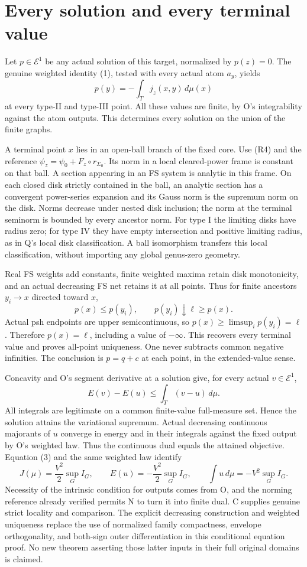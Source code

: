 \documentclass[
  11pt,
]{article}
\begin{document}
\section{Every solution and every terminal
value}\label{every-solution-and-every-terminal-value}

Let \(p\in\mathcal E^1\) be any actual solution of this target,
normalized by \(p(z)=0\). The genuine weighted identity (1), tested with
every actual atom \(a_y\), yields \[
 p(y)=-\int_Tj_z(x,y)\,d\mu(x)
\] at every type-II and type-III point. All these values are finite, by
O's integrability against the atom outputs. This determines every
solution on the union of the finite graphs.

A terminal point \(x\) lies in an open-ball branch of the fixed core.
Use (R4) and the reference \(\psi_z=\psi_0+F_z\circ r_{\Sigma_0}\). Its
norm in a local cleared-power frame is constant on that ball. A section
appearing in an FS system is analytic in this frame. On each closed disk
strictly contained in the ball, an analytic section has a convergent
power-series expansion and its Gauss norm is the supremum norm on the
disk. Norms decrease under nested disk inclusion; the norm at the
terminal seminorm is bounded by every ancestor norm. For type I the
limiting disks have radius zero; for type IV they have empty
intersection and positive limiting radius, as in Q's local disk
classification. A ball isomorphism transfers this local classification,
without importing any global genus-zero geometry.

Real FS weights add constants, finite weighted maxima retain disk
monotonicity, and an actual decreasing FS net retains it at all points.
Thus for finite ancestors \(y_i\to x\) directed toward \(x\), \[
 p(x)\leq p(y_i),\qquad p(y_i)\downarrow\ell\geq p(x).
\] Actual psh endpoints are upper semicontinuous, so
\(p(x)\geq\limsup_i p(y_i)=\ell\). Therefore \(p(x)=\ell\), including a
value of \(-\infty\). This recovers every terminal value and proves
all-point uniqueness. One never subtracts common negative infinities.
The conclusion is \(p=q+c\) at each point, in the extended-value sense.

Concavity and O's segment derivative at a solution give, for every
actual \(v\in\mathcal E^1\), \[
 E(v)-E(u)\leq\int_T(v-u)\,d\mu.
\] All integrals are legitimate on a common finite-value full-measure
set. Hence the solution attains the variational supremum. Actual
decreasing continuous majorants of \(u\) converge in energy and in their
integrals against the fixed output by O's weighted law. Thus the
continuous dual equals the attained objective. Equation (3) and the same
weighted law identify \[
 J(\mu)=\frac{V^2}{2}\sup_GI_G,\qquad
 E(u)=-\frac{V^2}{2}\sup_GI_G,\qquad
 \int u\,d\mu=-V^2\sup_GI_G.
\] Necessity of the intrinsic condition for outputs comes from O, and
the norming reference already verified permits N to turn it into finite
dual. C supplies genuine strict locality and comparison. The explicit
decreasing construction and weighted uniqueness replace the use of
normalized family compactness, envelope orthogonality, and both-sign
outer differentiation in this conditional equation proof. No new theorem
asserting those latter inputs in their full original domains is claimed.
\end{document}
